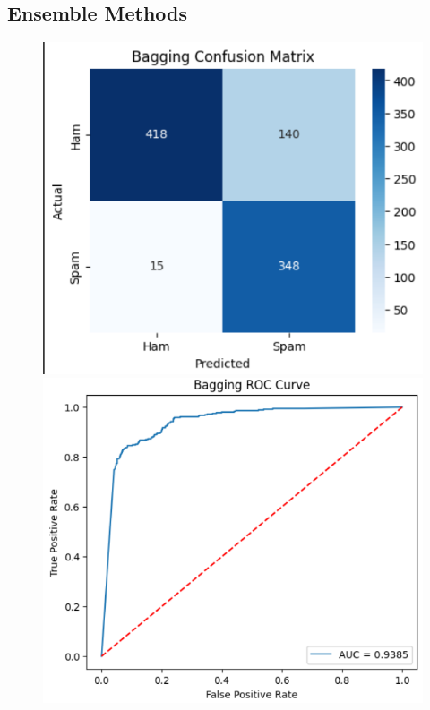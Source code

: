 \documentclass[12pt]{article}
\begin{document}
\subsection*{Ensemble Methods}
\begin{figure}[H]
\centering
\begin{minipage}{0.45\textwidth}
\centering
\includegraphics[width=\linewidth]{28.png}
\end{minipage}
\hfill
\begin{minipage}{0.45\textwidth}
\centering
\includegraphics[width=\linewidth]{29.png}
\end{minipage}
\end{figure}
\end{document}
